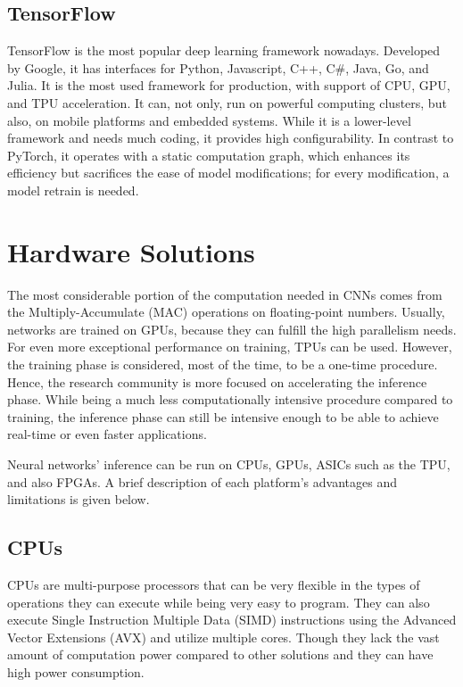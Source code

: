 \subsection{TensorFlow}
TensorFlow \cite{TensorFlow-Large-Scale-Machine-Learning-on-Heterogeneous-Distributed-Systems} \cite{TensorFlow-Official-site} \cite{TensorFlow-Wikipedia} is the most popular deep learning framework nowadays. Developed by Google, it has interfaces for Python, Javascript, C++, C\#, Java, Go, and Julia. It is the most used framework for production, with support of CPU, GPU, and TPU acceleration. It can, not only, run on powerful computing clusters, but also, on mobile platforms and embedded systems. While it is a lower-level framework and needs much coding, it provides high configurability. In contrast to PyTorch, it operates with a static computation graph, which enhances its efficiency but sacrifices the ease of model modifications; for every modification, a model retrain is needed.

\section{Hardware Solutions}
The most considerable portion of the computation needed in CNNs comes from the Multiply-Accumulate (MAC) operations on floating-point numbers. Usually, networks are trained on GPUs, because they can fulfill the high parallelism needs. For even more exceptional performance on training, TPUs can be used. However, the training phase is considered, most of the time, to be a one-time procedure. Hence, the research community is more focused on accelerating the inference phase. While being a much less computationally intensive procedure compared to training, the inference phase can still be intensive enough to be able to achieve real-time or even faster applications.

Neural networks' inference can be run on CPUs, GPUs, ASICs such as the TPU, and also FPGAs. A brief description of each platform's advantages and limitations is given below.

\subsection{CPUs}
CPUs are multi-purpose processors that can be very flexible in the types of operations they can execute while being very easy to program. They can also execute Single Instruction Multiple Data (SIMD) instructions using the Advanced Vector Extensions (AVX) \cite{AVX-Wikipedia} and utilize multiple cores. Though they lack the vast amount of computation power compared to other solutions and they can have high power consumption.

